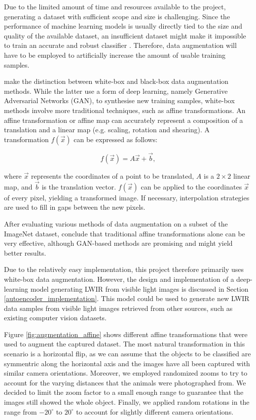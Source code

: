 \documentclass{l4proj}
\begin{document}
Due to the limited amount of time and resources available to the project, generating a dataset with sufficient scope and size is challenging. Since the performance of machine learning models is usually directly tied to the size and quality of the available dataset, an insufficient dataset might make it impossible to train an accurate and robust classifier \citep{fawzi_adaptive_2016}. Therefore, data augmentation will have to be employed to artificially increase the amount of usable training samples.

\citet{mikolajczyk_data_2018} make the distinction between white-box and black-box data augmentation methods. While the latter use a form of deep learning, namely Generative Adversarial Networks (GAN), to synthesise new training samples, white-box methods involve more traditional techniques, such as affine transformations. An affine transformation or affine map can accurately represent a composition of a translation and a linear map (e.g. scaling, rotation and shearing). A transformation $f(\vec{x})$ can be expressed as follows:

\begin{equation}
  f(\vec{x}) = A \vec{x} + \vec{b},
  \label{eqn:affine}
\end{equation}

where $\vec{x}$ represents the coordinates of a point to be translated, $A$ is a $2 \times 2$ linear map, and $\vec{b}$ is the translation vector. $f(\vec{x})$ can be applied to the coordinates $\vec{x}$ of every pixel, yielding a transformed image. If necessary, interpolation strategies are used to fill in gaps between the new pixels.

After evaluating various methods of data augmentation on a subset of the ImageNet dataset, \citet{perez_effectiveness_2017} conclude that traditional affine transformations alone can be very effective, although GAN-based methods are promising and might yield better results.

Due to the relatively easy implementation, this project therefore primarily uses white-box data augmentation. However, the design and implementation of a deep-learning model generating LWIR from visible light images is discussed in Section \ref{autoencoder_implementation}. This model could be used to generate new LWIR data samples from visible light images retrieved from other sources, such as existing computer vision datasets.

Figure \ref{fig:augmentation_affine} shows different affine transformations that were used to augment the captured dataset. The most natural transformation in this scenario is a horizontal flip, as we can assume that the objects to be classified are symmentric along the horizontal axis and the images have all been captured with similar camera orientations. Moreover, we employed randomized zooms to try to account for the varying distances that the animals were photographed from. We decided to limit the zoom factor to a small enough range to guarantee that the images still showed the whole object. Finally, we applied random rotations in the range from $-20^{\circ}$ to $20^{\circ}$ to account for slightly different camera orientations.
\end{document}
